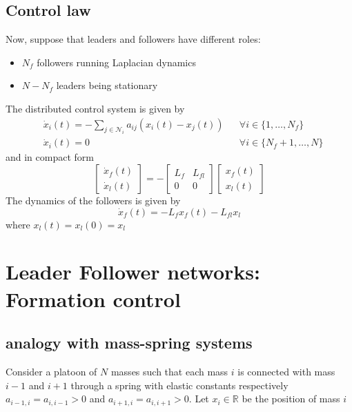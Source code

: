 \documentclass{book}
\newcommand{\R}{\mathbb{R}}
\theoremstyle{theoremv2}
\theoremstyle{defv2}
\theoremstyle{remark}
\theoremstyle{remark}
\theoremstyle{definition}
\theoremstyle{definition}
\begin{document}
\section{Control law}
Now, suppose that leaders and followers have different roles: 
\begin{itemize}
    \item $N_f$ followers running Laplacian dynamics
    \item $N-N_f$ leaders being stationary
\end{itemize}
The distributed control system is given by 
\begin{align*}
    & \dot{x}_i(t) = - \displaystyle\sum_{j\in\mathcal{N}_i}a_{ij} (x_i(t)-x_j(t)) && \forall i \in\{1,\dots,N_f\}\\
    & \dot{x}_i(t) = 0 && \forall i \in\{N_f+1,\dots,N\}
\end{align*}
and in compact form 
\[
    \begin{bmatrix}
        \dot{x}_f(t) \\ \dot{x}_l(t) 
    \end{bmatrix} = -\begin{bmatrix}
        L_f & L_{fl} \\ 0 & 0
    \end{bmatrix} \begin{bmatrix}
        x_f(t) \\ x_l(t)
    \end{bmatrix}
\]
The dynamics of the followers is given by 
\[
    \dot{x}_f(t) = -L_fx_f(t) - L_{fl}x_l
\]
where $x_l(t) = x_l(0)=x_l$
















\chapter{Leader Follower networks: Formation control}
\section{analogy with mass-spring systems}
Consider a platoon of $N$ masses such that each mass $i$ is connected with mass $i-1$ and $i+1$ through a spring with elastic constants respectively $a_{i-1,i} = a_{i,i-1}>0$ and $a_{i+1,i} = a_{i,i+1}>0$. Let $x_i\in \R$ be the position of mass $i$
\end{document}
